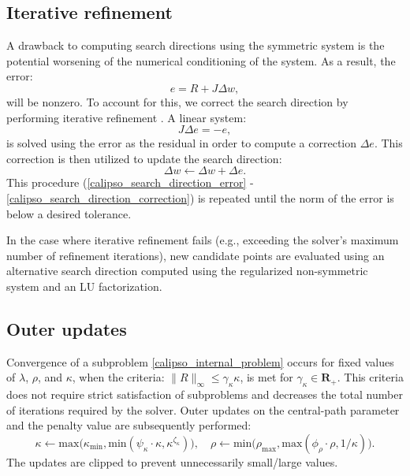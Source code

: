 \subsection{Iterative refinement} \label{calipso_iterative_refinement_appendix}
A drawback to computing search directions using the symmetric system is the potential worsening of the numerical conditioning of the system. As a result, the error:
\begin{equation} 
	e = R + J \Delta w, \label{calipso_search_direction_error}
\end{equation}
will be nonzero. To account for this, we correct the search direction by performing iterative refinement \cite{nocedal2006numerical}. A linear system:
\begin{equation}
	J \Delta e = -e,
\end{equation}
is solved using the error as the residual in order to compute a correction $\Delta e$. This correction is then utilized to update the search direction:
\begin{equation} 
	\Delta w \leftarrow \Delta w + \Delta e. \label{calipso_search_direction_correction}
\end{equation}
This procedure (\ref{calipso_search_direction_error} - \ref{calipso_search_direction_correction}) is repeated until the norm of the error is below a desired tolerance. 

In the case where iterative refinement fails (e.g., exceeding the solver's maximum number of refinement iterations), new candidate points are evaluated using an alternative search direction computed using the regularized non-symmetric system and an LU factorization.

\subsection{Outer updates}
Convergence of a subproblem \eqref{calipso_internal_problem} occurs for fixed values of $\lambda$, $\rho$, and $\kappa$, when the criteria: $\| R \|_{\infty} \leq \gamma_{\kappa} \kappa$,
is met for $\gamma_{\kappa} \in \mathbf{R}_+$. This criteria does not require strict satisfaction of subproblems and decreases the total number of iterations required by the solver. Outer updates on the central-path parameter and the penalty value are subsequently performed:
\begin{equation}
	\kappa \leftarrow  \mbox{max}\Big(\kappa_{\mbox{min}}, \mbox{min}(\psi_{\kappa} \cdot \kappa, \kappa^{\zeta_{\kappa}})\Big), \quad
	\rho \leftarrow \mbox{min}\Big(\rho_{\mbox{max}}, \mbox{max}(\phi_{\rho} \cdot \rho, 1 / \kappa) \Big). \label{calipso_outer_update}
\end{equation}
The updates are clipped to prevent unnecessarily small/large values.

